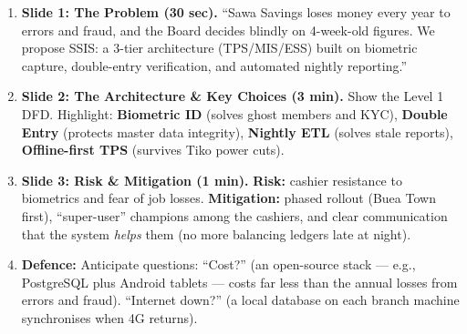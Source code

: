\documentclass[11pt]{article}
\begin{document}
\begin{methode}
\begin{enumerate}
    \item \textbf{Slide 1: The Problem (30 sec).} ``Sawa Savings loses money every year to errors and fraud, and the Board decides blindly on 4-week-old figures. We propose SSIS: a 3-tier architecture (TPS/MIS/ESS) built on biometric capture, double-entry verification, and automated nightly reporting.''
    \item \textbf{Slide 2: The Architecture \& Key Choices (3 min).} Show the Level 1 DFD. Highlight: \textbf{Biometric ID} (solves ghost members and KYC), \textbf{Double Entry} (protects master data integrity), \textbf{Nightly ETL} (solves stale reports), \textbf{Offline-first TPS} (survives Tiko power cuts).
    \item \textbf{Slide 3: Risk \& Mitigation (1 min).} \textbf{Risk:} cashier resistance to biometrics and fear of job losses. \textbf{Mitigation:} phased rollout (Buea Town first), ``super-user'' champions among the cashiers, and clear communication that the system \emph{helps} them (no more balancing ledgers late at night).
    \item \textbf{Defence:} Anticipate questions: ``Cost?'' (an open-source stack --- e.g., PostgreSQL plus Android tablets --- costs far less than the annual losses from errors and fraud). ``Internet down?'' (a local database on each branch machine synchronises when 4G returns).
\end{enumerate}
\end{methode}
\end{document}
